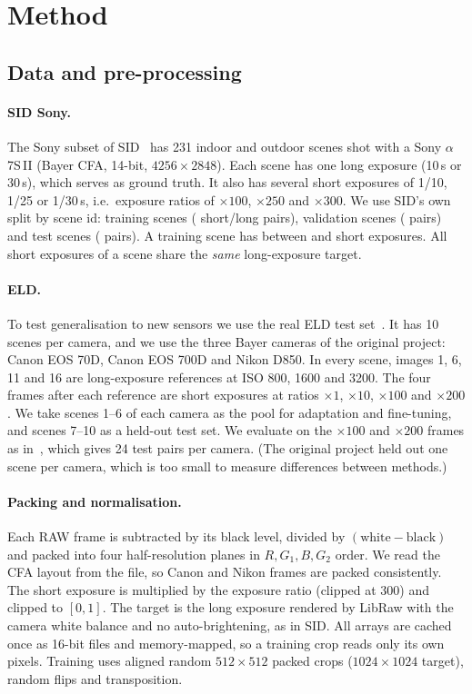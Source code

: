 \section{Method}
\label{sec:method}

\subsection{Data and pre-processing}
\label{sec:data}
\paragraph{SID Sony.} The Sony subset of SID~\cite{chen2018sid} has 231 indoor and outdoor scenes shot with a Sony $\alpha$7S\,II (Bayer CFA, 14-bit, $4256\times2848$). Each scene has one long exposure (10\,s or 30\,s), which serves as ground truth. It also has several short exposures of 1/10, 1/25 or 1/30\,s, i.e.\ exposure ratios of $\times100$, $\times250$ and $\times300$. We use SID's own split by scene id: \SIDTRAINSCENES{} training scenes (\SIDTRAINPAIRS{} short/long pairs), \SIDVALSCENES{} validation scenes (\SIDVALPAIRS{} pairs) and \SIDTESTSCENES{} test scenes (\SIDTESTPAIRS{} pairs). A training scene has between \SIDMINSHORT{} and \SIDMAXSHORT{} short exposures. All short exposures of a scene share the \emph{same} long-exposure target.

\paragraph{ELD.} To test generalisation to new sensors we use the real ELD test set~\cite{wei2020eld}. It has 10 scenes per camera, and we use the three Bayer cameras of the original project: Canon EOS 70D, Canon EOS 700D and Nikon D850. In every scene, images 1, 6, 11 and 16 are long-exposure references at ISO 800, 1600 and 3200. The four frames after each reference are short exposures at ratios $\times1$, $\times10$, $\times100$ and $\times200$. We take scenes 1--6 of each camera as the pool for adaptation and fine-tuning, and scenes 7--10 as a held-out test set. We evaluate on the $\times100$ and $\times200$ frames as in~\cite{wei2020eld}, which gives 24 test pairs per camera. (The original project held out one scene per camera, which is too small to measure differences between methods.)

\paragraph{Packing and normalisation.} Each RAW frame is subtracted by its black level, divided by $(\text{white}-\text{black})$ and packed into four half-resolution planes in $R,G_1,B,G_2$ order. We read the CFA layout from the file, so Canon and Nikon frames are packed consistently. The short exposure is multiplied by the exposure ratio (clipped at 300) and clipped to $[0,1]$. The target is the long exposure rendered by LibRaw with the camera white balance and no auto-brightening, as in SID. All arrays are cached once as 16-bit files and memory-mapped, so a training crop reads only its own pixels. Training uses aligned random $512\times512$ packed crops ($1024\times1024$ target), random flips and transposition.

